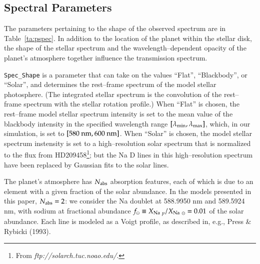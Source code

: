 \subsection{Spectral Parameters}
\label{rot_ssec:pspec}
The parameters pertaining to the shape of the observed spectrum are in
Table~\ref{ta:pspec}.  In addition to the location of the planet
within the stellar disk, the shape of the stellar spectrum and the
wavelength--dependent opacity of the planet's atmosphere together
influence the transmission spectrum.

{\tt Spec\_Shape} is a parameter that can take on the values ``Flat'',
``Blackbody'', or ``Solar'', and determines the rest--frame spectrum
of the model stellar photosphere.  (The integrated stellar spectrum is
the convolution of the rest--frame spectrum with the stellar rotation
profile.)  When ``Flat'' is chosen, the rest--frame model stellar
spectrum intensity is set to the mean value of the blackbody intensity
in the specified wavelength range $[\lambda_{\rm min},\lambda_{\rm
max}]$, which, in our simulation, is set to $[580 {\rm~nm}, 600
{\rm~nm}]$.  When ``Solar'' is chosen, the model stellar spectrum
instensity is set to a high--resolution solar spectrum that is
normalized to the flux from HD209458\footnote{From {\it
ftp://solarch.tuc.noao.edu/}.}; but the Na D lines in this
high--resolution spectrum have been replaced by Gaussian fits to the
solar lines.

The planet's atmosphere has $N_{\rm abs}$ absorption features, each of
which is due to an element with a given fraction of the solar
abundance.  In the models presented in this paper, $N_{\rm abs} = 2$:
we consider the Na doublet at 588.9950 nm and 589.5924 nm, with sodium
at fractional abundance $f_\odot \equiv {X_{\rm Na~}}_p / {X_{\rm
Na~}}_\odot = 0.01$ of the solar abundance.  Each line is modeled as a
Voigt profile, as described in, e.g., Press \& Rybicki (1993).

